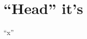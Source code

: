 \documentclass[11pt]{article}
\author{Au}
\date{2026-01-01}
\title{}
\begin{document}
\tableofcontents

\section{``Head'' it's}
\label{sec:orgb9d83e4}
``x''
\end{document}
